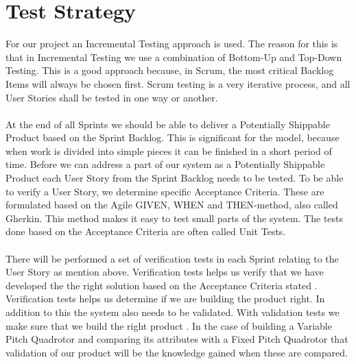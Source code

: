\section{Test Strategy}
For our project an Incremental Testing approach is used. The reason for this is that in Incremental Testing we use a combination of Bottom-Up and Top-Down Testing. This is a good approach because, in Scrum, the most critical Backlog Items will always be chosen first. Scrum testing is a very iterative process, and all User Stories shall be tested in one way or another.\\
\\
At the end of all Sprints we should be able to deliver a Potentially Shippable Product based on the Sprint Backlog. This is significant for the model, because when work is divided into simple pieces it can be finished in a short period of time. Before we can address a part of our system as a Potentially Shippable Product each User Story from the Sprint Backlog needs to be tested. To be able to verify a User Story, we determine specific Acceptance Criteria. These are formulated based on the Agile GIVEN, WHEN and THEN-method, also called Gherkin. This method makes it easy to test small parts of the system. The tests done based on the Acceptance Criteria are often called Unit Tests.\\
\\
There will be performed a set of verification tests in each Sprint relating to the User Story as mention above. Verification tests helps us verify that we have developed the the right solution based on the Acceptance Criteria stated \cite{ref1}. Verification tests helps us determine if we are building the product right. In addition to this the system also needs to be validated. With validation tests we make sure that we build the right product \cite{ref5}. In the case of building a Variable Pitch Quadrotor and comparing its attributes with a Fixed Pitch Quadrotor that validation of our product will be the knowledge gained when these are compared.\\
\\
